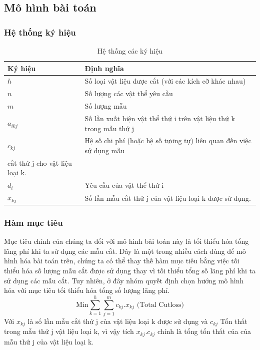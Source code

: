 \documentclass[a4paper]{article}
\begin{document}
\subsection{Mô hình bài toán}
\subsubsection{Hệ thống ký hiệu}
 \begin{table}[h]
        \centering
        \begin{tabular}{ll}    
        \hline \hline
        Ký hiệu     & Định nghĩa \\ \hline \hline
        $h$     & Số loại vật liệu được cắt (với các kích cỡ khác nhau) \\
        $n$     & Số lượng các vật thể yêu cầu \\
        $m$     & Số lượng mẫu \\
        $a_{ikj}$     & Số lần xuất hiện vật thể thứ i trên vật liệu thứ k trong mẫu thứ j \\
        $c_{kj}$     & Hệ số chi phí (hoặc hệ số tương tự) liên quan đến việc sử dụng mẫu\\ cắt thứ j cho vật liệu loại k. \\
        $d_{i}$     & Yêu cầu của vật thể thứ i \\
        \hline
        $x_{kj}$     &  Số lần mẫu cắt thứ j của vật liệu loại k được sử dụng.\\    
        \hline \hline
        \end{tabular}
        \caption{Hệ thống các ký hiệu}
        \label{Symbol}
    \end{table}
\subsubsection{Hàm mục tiêu}
\indent \indent Mục tiêu chính của chúng ta đối với mô hình bài toán này là tối thiểu hóa tổng lãng phí khi ta sử dụng các mẫu cắt. Đây là một trong nhiều cách dùng để mô hình hóa bài toán trên, chúng ta có thể thay thế hàm mục tiêu bằng việc tối thiểu hóa số lượng mẫu cắt được sử dụng thay vì tối thiểu tổng số lãng phí khi ta sử dụng các mẫu cắt. Tuy nhiên, ở đây nhóm quyết định chọn hướng mô hình hóa với mục tiêu tối thiểu hóa tổng số lượng lãng phí. \\
\begin{equation}
    \text{Min} \sum_{k = 1}^{h}\sum_{j = 1}^{m} c_{kj}.x_{kj} \text{ (Total Cutloss)}
\end{equation}
\indent Với $x_{kj}$ là số lần mẫu cắt thứ j của vật liệu loại k được sử dụng và $c_{kj}$ Tổn thất trong mẫu thứ j vật liệu loại k, vì vậy tích $x_{kj}.c_{kj}$ chính là tổng tổn thất của của mẫu thứ j của vật liệu loại k.
\end{document}
